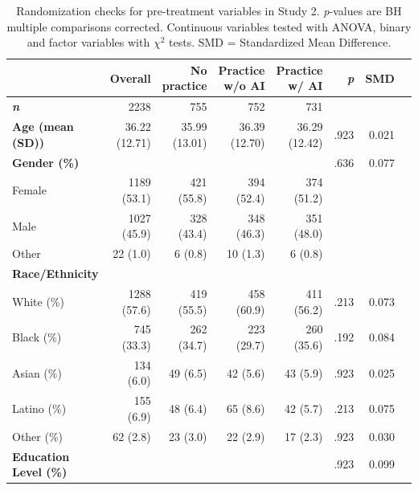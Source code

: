 \documentclass[11pt]{report}
\begin{document}
\begin{append}
    \begin{table}[h]
        \centering
            \caption{Randomization checks for pre-treatment variables in Study 2. \textit{p}-values are BH multiple comparisons corrected. Continuous variables tested with ANOVA, binary and factor variables with $\chi^2$ tests. SMD = Standardized Mean Difference.}
            \footnotesize
        \label{tab:s2randomization}
    \begin{tabular}{lrrrrrrr}
    \toprule
    \multicolumn{1}{l}{} & Overall & No practice & Practice w/o AI & Practice w/ AI & \textit{p} &  SMD \\ 
    \midrule
    \textit{\textbf{n}} & 2238 &  755 &  752 &  731 &  &   \\ 
    \textbf{Age (mean (SD))} & 36.22 (12.71) & 35.99 (13.01) & 36.39 (12.70) & 36.29 (12.42) & .923  &  0.021 \\ 
    \textbf{Gender (\%)} &  &   &   &   & .636 &   0.077 \\ 
    \hspace{1em}   Female & 1189 (53.1)  &  421 (55.8)  &  394 (52.4)  &  374 (51.2)  &  &  \\ 
       \hspace{1em}Male & 1027 (45.9)  &  328 (43.4)  &  348 (46.3)  &  351 (48.0)  &  &    \\ 
       \hspace{1em}Other &   22 (1.0)  &    6 (0.8)  &   10 (1.3)  &    6 (0.8)    &  &  \\ 
       \textbf{Race/Ethnicity} &  &   &   &   &  &  \\
    \hspace{1em}White (\%) & 1288 (57.6)  &  419 (55.5)  &  458 (60.9)  &  411 (56.2)  & .213 &  0.073 \\ 
    \hspace{1em}Black (\%) &  745 (33.3)  &  262 (34.7)  &  223 (29.7)  &  260 (35.6)  & .192 &  0.084 \\ 
    \hspace{1em}Asian (\%) &  134 (6.0)  &   49 (6.5)  &   42 (5.6)  &   43 (5.9)  & .923   &  0.025 \\ 
    \hspace{1em}Latino (\%) &  155 (6.9)  &   48 (6.4)  &   65 (8.6)  &   42 (5.7)  & .213   &  0.075 \\
    \hspace{1em}Other (\%) &   62 (2.8)  &   23 (3.0)  &   22 (2.9)  &   17 (2.3)  & .923 &   0.030 \\ 
    \textbf{Education Level (\%)} &  &   &   &   & .923 &    0.099 \\ 

\end{tabular}
\end{table}
\end{append}
\end{document}
